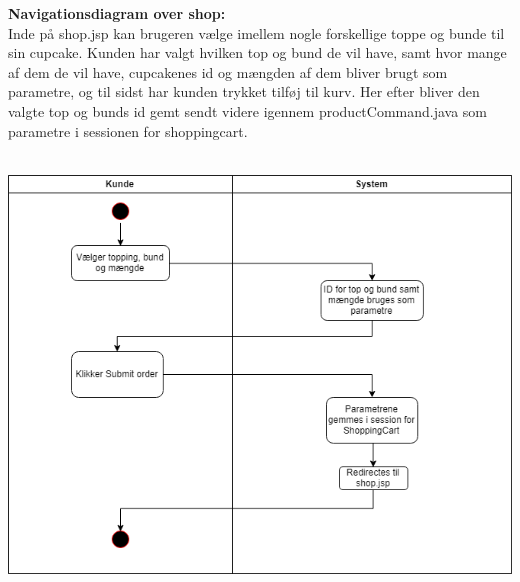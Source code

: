 \documentclass[11pt]{report}
\begin{document}
\noindent
\textbf{Navigationsdiagram over shop:}\\
Inde på shop.jsp kan brugeren vælge imellem nogle forskellige toppe og bunde til sin cupcake. Kunden har valgt hvilken top og bund de vil have, samt hvor mange af dem de vil have, cupcakenes id og mængden af dem bliver brugt som parametre, og til sidst har kunden trykket tilføj til kurv. Her efter bliver den valgte top og bunds id gemt sendt videre igennem productCommand.java  som parametre i sessionen for shoppingcart.\\\\
\begin{center}
\includegraphics[width=15cm]{ShopCupcake.png}
\end{center}
\newpage
\end{document}

